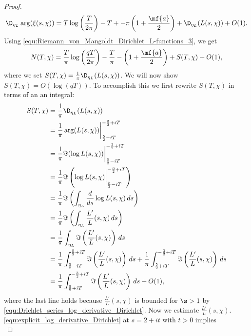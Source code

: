 \begin{proof}
        \[
          \D_{\eta_{L}}\arg(\xi(s,\chi)) = T\log\left(\frac{T}{2\pi}\right)-T+-\pi\left(1+\frac{\mf{a}}{2}\right)+\D_{\eta_{L}}(L(s,\chi))+O(1).
        \]
        Using \cref{equ:Riemann_von_Mangoldt_Dirichlet_L-functions_3}, we get
        \begin{equation}\label{equ:Riemann_von_Mangoldt_Dirichlet_L-functions_7}
          N(T,\chi) = \frac{T}{\pi}\log\left(\frac{qT}{2\pi}\right)-\frac{T}{\pi}-\left(1+\frac{\mf{a}}{2}\right)+S(T,\chi)+O(1),
        \end{equation}
        where we set $S(T,\chi) = \frac{1}{\pi}\D_{\eta_{L}}(L(s,\chi))$. We will now show $S(T,\chi) = O(\log(qT))$. To accomplish this we first rewrite $S(T,\chi)$ in terms of an  an integral:
        \begin{equation}\label{equ:Riemann_von_Mangoldt_Dirichlet_L-functions_8}
          \begin{aligned}
            S(T,\chi) &= \frac{1}{\pi}\D_{\eta_{L}}(L(s,\chi)) \\
            &= \frac{1}{\pi}\arg(L(s,\chi))\bigg|_{\frac{5}{2}-iT}^{-\frac{3}{2}+iT} \\
            &= \frac{1}{\pi}\Im(\log L(s,\chi))\bigg|_{\frac{5}{2}-iT}^{-\frac{3}{2}+iT} \\
            &= \frac{1}{\pi}\Im\left(\log L(s,\chi)\bigg|_{\frac{5}{2}-iT}^{-\frac{3}{2}+iT}\right) \\
            &= \frac{1}{\pi}\Im\left(\int_{\eta_{L}}\frac{d}{ds}\log L(s,\chi)\,ds\right) \\
            &= \frac{1}{\pi}\Im\left(\int_{\eta_{L}}\frac{L'}{L}(s,\chi)\,ds\right) \\
            &= \frac{1}{\pi}\int_{\eta_{L}}\Im\left(\frac{L'}{L}(s,\chi)\right)\,ds \\
            &= \frac{1}{\pi}\int_{\frac{5}{2}-iT}^{\frac{5}{2}+iT}\Im\left(\frac{L'}{L}(s,\chi)\right)\,ds+\frac{1}{\pi}\int_{\frac{5}{2}+iT}^{-\frac{3}{2}+iT}\Im\left(\frac{L'}{L}(s,\chi)\right)\,ds \\
            &= \frac{1}{\pi}\int_{\frac{5}{2}+iT}^{-\frac{3}{2}+iT}\Im\left(\frac{L'}{L}(s,\chi)\right)\,ds+O(1),
          \end{aligned}
        \end{equation}
        where the last line holds because $\frac{L'}{L}(s,\chi)$ is bounded for $\s > 1$ by \cref{equ:Drichlet_series_log_derivative_Dirichlet}. Now we estimate $\frac{L'}{L}(s,\chi)$. \cref{equ:explicit_log_derivative_Dirichlet} at $s = 2+it$ with $t > 0$ implies
        \begin{equation}\label{equ:Riemann_von_Mangoldt_Dirichlet_L-functions_9}

\end{equation}
\end{proof}
